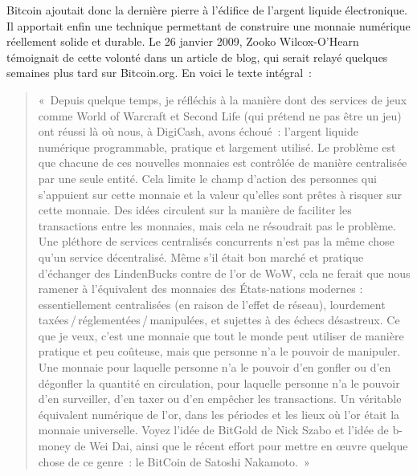 Bitcoin ajoutait donc la dernière pierre à l'édifice de l'argent liquide électronique. Il apportait enfin une technique permettant de construire une monnaie numérique réellement solide et durable. Le 26 janvier 2009, Zooko Wilcox-O'Hearn témoignait de cette volonté dans un article de blog, qui serait relayé quelques semaines plus tard sur Bitcoin.org. En voici le texte intégral~:

\begin{quote}
«~Depuis quelque temps, je réfléchis à la manière dont des services de jeux comme World of Warcraft et Second Life (qui prétend ne pas être un jeu) ont réussi là où nous, à DigiCash, avons échoué~: l'argent liquide numérique programmable, pratique et largement utilisé. Le problème est que chacune de ces nouvelles monnaies est contrôlée de manière centralisée par une seule entité. Cela limite le champ d'action des personnes qui s'appuient sur cette monnaie et la valeur qu'elles sont prêtes à risquer sur cette monnaie. Des idées circulent sur la manière de faciliter les transactions entre les monnaies, mais cela ne résoudrait pas le problème. Une pléthore de services centralisés concurrents n'est pas la même chose qu'un service décentralisé. Même s'il était bon marché et pratique d'échanger des LindenBucks contre de l'or de WoW, cela ne ferait que nous ramener à l'équivalent des monnaies des États-nations modernes : essentiellement centralisées (en raison de l'effet de réseau), lourdement taxées\,/\,réglementées\,/\,manipulées, et sujettes à des échecs désastreux. Ce que je veux, c'est une monnaie que tout le monde peut utiliser de manière pratique et peu coûteuse, mais que personne n'a le pouvoir de manipuler. Une monnaie pour laquelle personne n'a le pouvoir d'en gonfler ou d'en dégonfler la quantité en circulation, pour laquelle personne n'a le pouvoir d'en surveiller, d'en taxer ou d'en empêcher les transactions. Un véritable équivalent numérique de l'or, dans les périodes et les lieux où l'or était la monnaie universelle. Voyez l'idée de BitGold de Nick Szabo et l'idée de b-money de Wei Dai, ainsi que le récent effort pour mettre en œuvre quelque chose de ce genre~: le BitCoin de Satoshi Nakamoto.~»

\end{quote}
